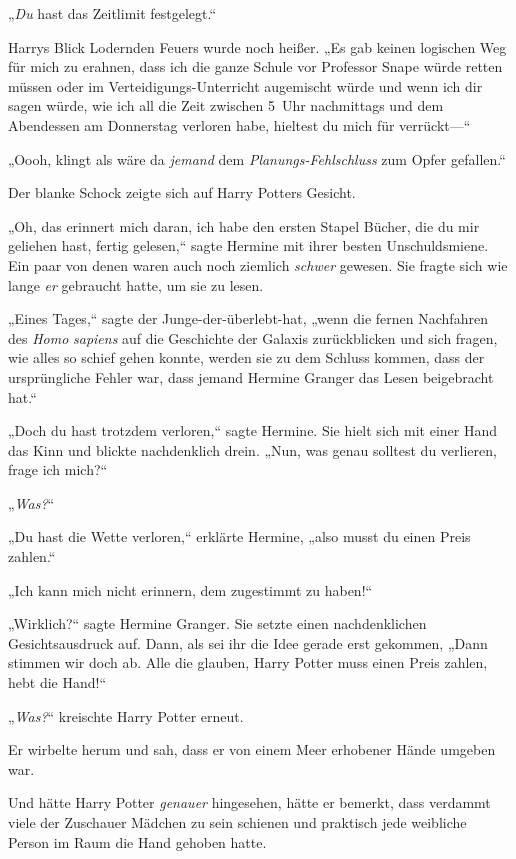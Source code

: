 {„\emph{Du} hast das Zeitlimit festgelegt.“

Harrys Blick Lodernden Feuers wurde noch heißer. „Es gab keinen logischen Weg für mich zu erahnen, dass ich die ganze Schule vor Professor Snape würde retten müssen oder im Verteidigungs-Unterricht augemischt würde und wenn ich dir sagen würde, wie ich all die Zeit zwischen 5~Uhr nachmittags und dem Abendessen am Donnerstag verloren habe, hieltest du mich für verrückt—“

„Oooh, klingt als wäre da \emph{jemand} dem \emph{Planungs-Fehlschluss} zum Opfer gefallen.“

Der blanke Schock zeigte sich auf Harry Potters Gesicht.

„Oh, das erinnert mich daran, ich habe den ersten Stapel Bücher, die du mir geliehen hast, fertig gelesen,“ sagte Hermine mit ihrer besten Unschuldsmiene. Ein paar von denen waren auch noch ziemlich \emph{schwer} gewesen. Sie fragte sich wie lange \emph{er} gebraucht hatte, um sie zu lesen.

„Eines Tages,“ sagte der Junge-der-überlebt-hat, „wenn die fernen Nachfahren des \emph{Homo} \emph{sapiens} auf die Geschichte der Galaxis zurückblicken und sich fragen, wie alles so schief gehen konnte, werden sie zu dem Schluss kommen, dass der ursprüngliche Fehler war, dass jemand Hermine Granger das Lesen beigebracht hat.“

„Doch du hast trotzdem verloren,“ sagte Hermine. Sie hielt sich mit einer Hand das Kinn und blickte nachdenklich drein. „Nun, was genau solltest du verlieren, frage ich mich?“

„\emph{Was?}“

„Du hast die Wette verloren,“ erklärte Hermine, „also musst du einen Preis zahlen.“

„Ich kann mich nicht erinnern, dem zugestimmt zu haben!“

„Wirklich?“ sagte Hermine Granger. Sie setzte einen nachdenklichen Gesichtsausdruck auf. Dann, als sei ihr die Idee gerade erst gekommen, „Dann stimmen wir doch ab. Alle die glauben, Harry Potter muss einen Preis zahlen, hebt die Hand!“

„\emph{Was?}“ kreischte Harry Potter erneut.

Er wirbelte herum und sah, dass er von einem Meer erhobener Hände umgeben war.

Und hätte Harry Potter \emph{genauer} hingesehen, hätte er bemerkt, dass verdammt viele der Zuschauer Mädchen zu sein schienen und praktisch jede weibliche Person im Raum die Hand gehoben hatte.

}
